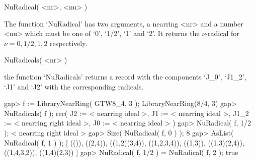 

\>NuRadical( <nr>, <nu> )

The function `NuRadical' has two arguments, a nearring <nr> and a number
<nu> which must be one of `0', `1/2', `1' and `2'. It returns the
$\nu$-radical for $\nu = 0, 1/2, 1, 2$ respectively.

\>NuRadicals( <nr> )

the function `NuRadicals' returns a record with the components `J_0', `J1_2',
`J1' and `J2' with the corresponding radicals.

\beginexample
    gap> f := LibraryNearRing( GTW8_4, 3 );
    LibraryNearRing(8/4, 3)
    gap> NuRadicals( f );
    rec( J2 := < nearring ideal >, J1 := < nearring ideal >, 
      J1_2 := < nearring right ideal >, J0 := < nearring ideal > )
    gap> NuRadical( f, 1/2 );
    < nearring right ideal >
    gap> Size( NuRadical( f, 0 ) );  
    8
    gap> AsList( NuRadical( f, 1 ) );
    [ (()), ((2,4)), ((1,2)(3,4)), ((1,2,3,4)), ((1,3)), ((1,3)(2,4)), 
      ((1,4,3,2)), ((1,4)(2,3)) ]
    gap> NuRadical( f, 1/2 ) = NuRadical( f, 2 );
    true
\endexample



